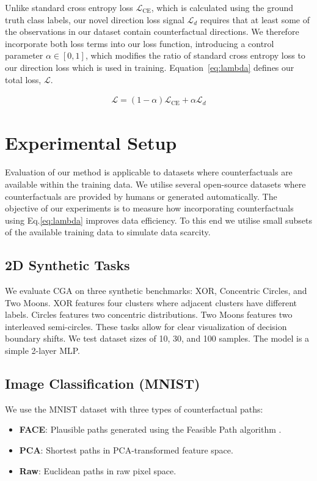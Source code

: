 \documentclass[sigconf,anonymous]{aamas}
\begin{document}
Unlike standard cross entropy loss $\mathcal{L}_{\textrm{CE}}$, which is calculated using the ground truth class labels, our novel direction loss signal $\mathcal{L}_{d}$ requires that at least some of the observations in our dataset contain counterfactual directions. We therefore incorporate both loss terms into our loss function, introducing a control parameter $\alpha \in [0,1]$, which modifies the ratio of standard cross entropy loss to our direction loss which is used in training. Equation~\ref{eq:lambda} defines our total loss, $\mathcal{L}$.

\begin{align}\label{eq:lambda}
    \mathcal{L} = (1-\alpha)\mathcal{L}_{\textrm{CE}} + \alpha \mathcal{L}_{d}
\end{align}

\section{Experimental Setup}
Evaluation of our method is applicable to datasets where counterfactuals are available within the training data. We utilise several open-source datasets where counterfactuals are provided by humans \cite{Kaushik2020Learning} or generated automatically. The objective of our experiments is to measure how incorporating counterfactuals using Eq.\ref{eq:lambda} improves data efficiency. To this end we utilise small subsets of the available training data to simulate data scarcity.

\subsection{2D Synthetic Tasks}
We evaluate CGA on three synthetic benchmarks: XOR, Concentric Circles, and Two Moons. XOR features four clusters where adjacent clusters have different labels. Circles features two concentric distributions. Two Moons features two interleaved semi-circles. These tasks allow for clear visualization of decision boundary shifts. We test dataset sizes of 10, 30, and 100 samples. The model is a simple 2-layer MLP.

\subsection{Image Classification (MNIST)}
We use the MNIST dataset with three types of counterfactual paths:

\begin{itemize}
    \item \textbf{FACE}: Plausible paths generated using the Feasible Path algorithm \cite{poyiadzi2020face}.
    \item \textbf{PCA}: Shortest paths in PCA-transformed feature space.
    \item \textbf{Raw}: Euclidean paths in raw pixel space.
\end{itemize}
\end{document}
